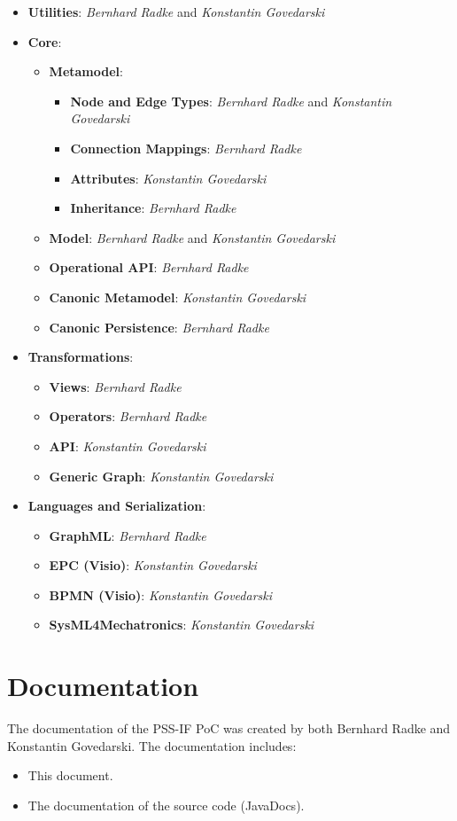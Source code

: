 \begin{itemize}
\item \textbf{Utilities}: \textit{Bernhard Radke} and \textit{Konstantin Govedarski}
\item \textbf{Core}:
	\begin{itemize}
	\item \textbf{Metamodel}:
		\begin{itemize}
		\item \textbf{Node and Edge Types}: \textit{Bernhard Radke} and \textit{Konstantin Govedarski}
		\item \textbf{Connection Mappings}: \textit{Bernhard Radke}
		\item \textbf{Attributes}: \textit{Konstantin Govedarski}
		\item \textbf{Inheritance}: \textit{Bernhard Radke}
		\end{itemize}
	\item \textbf{Model}: \textit{Bernhard Radke} and \textit{Konstantin Govedarski}
	\item \textbf{Operational API}: \textit{Bernhard Radke}
	\item \textbf{Canonic Metamodel}: \textit{Konstantin Govedarski}
	\item \textbf{Canonic Persistence}: \textit{Bernhard Radke}
 	\end{itemize}
\item \textbf{Transformations}:
	\begin{itemize}
	\item \textbf{Views}: \textit{Bernhard Radke}
	\item \textbf{Operators}: \textit{Bernhard Radke}
	\item \textbf{API}: \textit{Konstantin Govedarski}
	\item \textbf{Generic Graph}: \textit{Konstantin Govedarski}
	\end{itemize}
\item \textbf{Languages and Serialization}:
	\begin{itemize}
	\item \textbf{GraphML}: \textit{Bernhard Radke}
	\item \textbf{EPC (Visio)}: \textit{Konstantin Govedarski}
	\item \textbf{BPMN (Visio)}: \textit{Konstantin Govedarski}
	\item \textbf{SysML4Mechatronics}: \textit{Konstantin Govedarski}
	\end{itemize}
\end{itemize}

\section*{Documentation}

The documentation of the PSS-IF PoC was created by both Bernhard Radke and Konstantin Govedarski. The documentation includes:

\begin{itemize}
\item This document.
\item The documentation of the source code (JavaDocs).
\end{itemize}